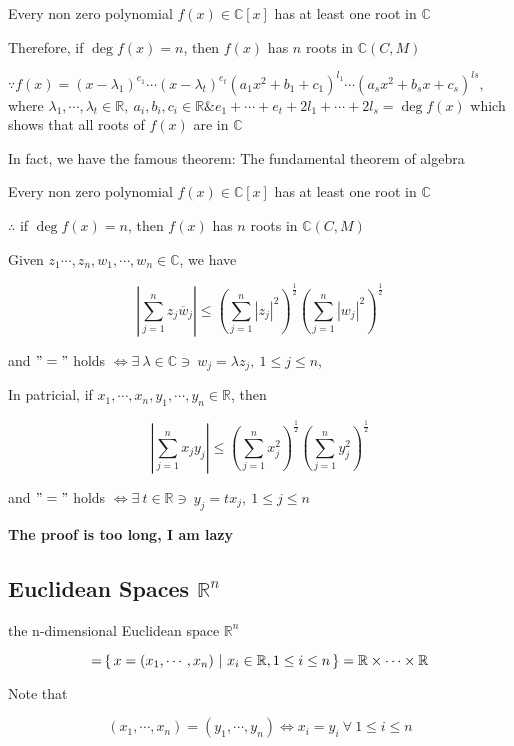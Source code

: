 Every non zero polynomial $f(x) \in \mathbb C[x]$ has at least one root in $\mathbb C$

Therefore, if $\deg f(x) = n$, then $f(x)$ has $n$ roots in $\mathbb C (C,M)$
\begin{tcolorbox}
	$\because f(x) = (x-\lambda_1)^{e_1}\cdots(x-\lambda_t)^{e_t}(a_1x^2+b_1+c_1)^{l_1}\cdots(a_sx^2+b_sx+c_s)^{ls},$ where $\lambda_1,\cdots,\lambda_t \in \mathbb R,~a_i,b_i,c_i \in \mathbb R \& e_1+\cdots+e_t+2l_1+\cdots+2l_s = \deg f(x)$ which shows that all roots of $f(x)$ are in $\mathbb C$
	
	In fact, we have the famous theorem: The fundamental theorem of algebra
	
	Every non zero polynomial $f(x) \in \mathbb C[x]$ has at least one root in $\mathbb C$
	
	$\therefore$ if $\deg f(x) = n$, then $f(x)$ has $n$ roots in $\mathbb C (C,M)$
\end{tcolorbox}

\newpage

\begin{thm*}
	Given $z_1\cdots,z_n,w_1,\cdots,w_n \in \mathbb C$, we have
	
	$$\left|\sum^n_{j=1}z_j\overline{w}_j\right| \leq \left(\sum^n_{j=1}|z_j|^2\right)^{\frac{1}{2}}\left(\sum^n_{j=1}|w_j|^2\right)^{\frac{1}{2}}$$
	
	and $"="$ holds $\Leftrightarrow \exists~\lambda \in \mathbb C \ni~ w_j = \lambda z_j,~1\leq j \leq n,$
	
	In patricial, if $x_1,\cdots,x_n,y_1,\cdots,y_n \in \mathbb R$, then
	
	$$\left|\sum^n_{j=1}x_jy_j\right| \leq \left( \sum^n_{j=1}x_j^2\right)^\frac{1}{2}\left(\sum^n_{j=1}y_j^2\right)^{\frac{1}{2}}$$
	
	and $"="$ holds $\Leftrightarrow \exists~t \in \mathbb R \ni~ y_j = tx_j,~1\leq j \leq n$
\end{thm*}

\textbf{\color{red}The proof is too long, I am lazy}

\subsection{Euclidean Spaces $\mathbb R^n$}

\begin{defn}
	the n-dimensional Euclidean space $\mathbb R^n$
	
	$$\mathbb = \left\{ \,x = (x_1,\cdots,x_n)~|~x_i \in \mathbb R, 1\leq i \leq n \,\right\} = \mathbb R \times \cdots \times \mathbb R$$
	
	Note that
	
	$$(x_1,\cdots,x_n) = (y_1,\cdots,y_n) \Leftrightarrow x_i=y_i ~\forall~1\leq i \leq n$$
\end{defn}

